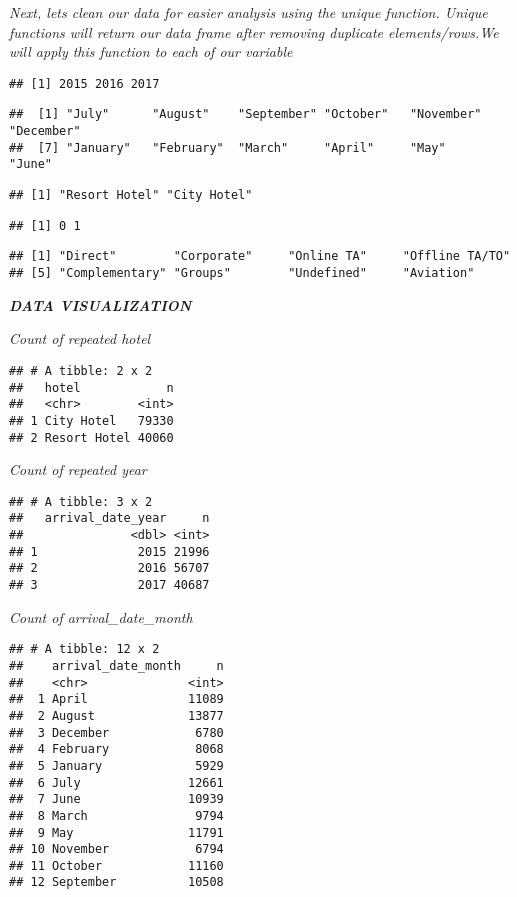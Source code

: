 \documentclass[
]{article}
\begin{document}
\emph{Next, lets clean our data for easier analysis using the unique
function. Unique functions will return our data frame after removing
duplicate elements/rows.We will apply this function to each of our
variable}

\begin{verbatim}
## [1] 2015 2016 2017
\end{verbatim}

\begin{verbatim}
##  [1] "July"      "August"    "September" "October"   "November"  "December" 
##  [7] "January"   "February"  "March"     "April"     "May"       "June"
\end{verbatim}

\begin{verbatim}
## [1] "Resort Hotel" "City Hotel"
\end{verbatim}

\begin{verbatim}
## [1] 0 1
\end{verbatim}

\begin{verbatim}
## [1] "Direct"        "Corporate"     "Online TA"     "Offline TA/TO"
## [5] "Complementary" "Groups"        "Undefined"     "Aviation"
\end{verbatim}

\textbf{\emph{DATA VISUALIZATION}}

\emph{Count of repeated hotel}

\begin{verbatim}
## # A tibble: 2 x 2
##   hotel            n
##   <chr>        <int>
## 1 City Hotel   79330
## 2 Resort Hotel 40060
\end{verbatim}

\emph{Count of repeated year}

\begin{verbatim}
## # A tibble: 3 x 2
##   arrival_date_year     n
##               <dbl> <int>
## 1              2015 21996
## 2              2016 56707
## 3              2017 40687
\end{verbatim}

\emph{Count of arrival\_date\_month}

\begin{verbatim}
## # A tibble: 12 x 2
##    arrival_date_month     n
##    <chr>              <int>
##  1 April              11089
##  2 August             13877
##  3 December            6780
##  4 February            8068
##  5 January             5929
##  6 July               12661
##  7 June               10939
##  8 March               9794
##  9 May                11791
## 10 November            6794
## 11 October            11160
## 12 September          10508
\end{verbatim}
\end{document}
